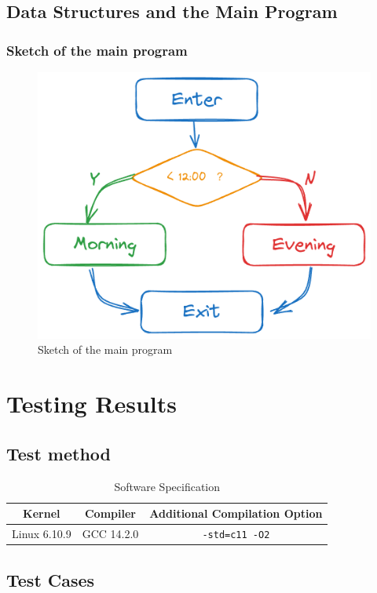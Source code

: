 \documentclass[10pt, twoside]{article}
\begin{document}
\subsection{Data Structures and the Main Program}

\lipsum[8-9]

\subsubsection{Sketch of the main program}

\begin{figure}[!ht]
    \centering
    \includegraphics[width=0.5\linewidth]{assets/sketch.png}
    \caption{Sketch of the main program}
\end{figure}

\section{Testing Results}

\subsection{Test method}

\lipsum[10-11]

\begin{table}[!ht]
    \centering
    \caption{Software Specification}
    \begin{tabular}{ccc}
        \toprule
        \textbf{Kernel} & \textbf{Compiler} & \textbf{Additional Compilation Option} \\
        \midrule
        Linux 6.10.9    & GCC 14.2.0        & \verb|-std=c11 -O2|                    \\
        \bottomrule
    \end{tabular}
\end{table}

\subsection{Test Cases}
\end{document}
